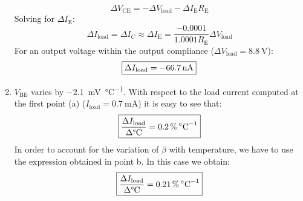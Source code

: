 \begin{enumerate}
    \[\Delta V_\text{CE}=-\Delta V_\text{load}-\Delta I_\text{E}R_\text{E}\]
    Solving for $\Delta I_\text{E}$:
    \[\Delta I_\text{load}=\Delta I_{C}\approx \Delta I_\text{E}=\frac{-0.0001}{1.0001R_\text{E}}\Delta V_\text{load}\]
    For an output voltage within the output compliance ($\Delta V_\text{load}=\SI{8.8}{\volt}$):
    \[\boxed{\Delta I_\text{load}=\SI{-66.7}{\nano\ampere}}\]
    \item 
    $V_\text{BE}$ varies by \SI{-2.1}{\milli\volt\per\celsius}. With respect to the load current computed at the first point (a) ($I_\text{load}=\SI{0.7}{\milli\ampere}$) it is easy to see that:
    \[\boxed{\frac{\Delta I_\text{load}}{\Delta \text{°C}}=\SI{0.2}{\percent\per\celsius}}\]
    In order to account for the variation of $\beta$ with temperature, we have to use the expression obtained in point b. In this case we obtain:
    \[\boxed{\frac{\Delta I_\text{load}}{\Delta \text{°C}}=\SI{0.21}{\percent\per\celsius}}\]
\end{enumerate}








